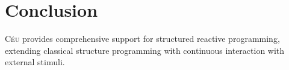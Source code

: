 \documentclass{acm_proc_article-sp}
\newcommand{\CEU}{\textsc{C\'{e}u}\xspace}
\newcommand{\1}{\;}
\newcommand{\2}{\;\;}
\newcommand{\3}{\;\;\;}
\newcommand{\5}{\;\;\;\;\;}
\begin{document}

\section{Conclusion}
\label{sec.conclusion}

\CEU provides comprehensive support for structured reactive programming, 
extending classical structure programming with continuous interaction with
external stimuli.
\end{document}
